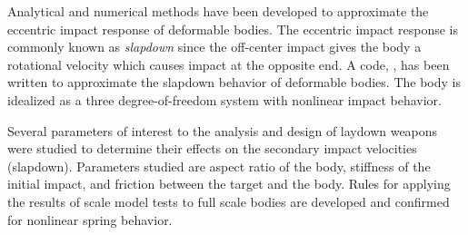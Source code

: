 Analytical and numerical methods have been developed to approximate
the eccentric impact response of deformable bodies.  The eccentric
impact response is commonly known as {\em slapdown} since the
off-center impact gives the body a rotational velocity which causes
impact at the opposite end.  A code, \SLAP , has been written to
approximate the slapdown behavior of deformable bodies. The body is
idealized as a three degree-of-freedom system with nonlinear impact
behavior.

Several parameters of interest to the analysis and design of laydown
weapons were studied to determine their effects on the secondary
impact velocities (slapdown).  Parameters studied are aspect ratio of
the body, stiffness of the initial impact, and friction between the
target and the body. Rules for applying the results of scale model
tests to full scale bodies are developed and confirmed for nonlinear
spring behavior.
